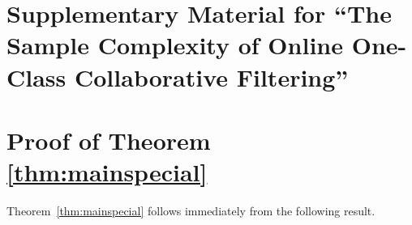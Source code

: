 \documentclass{article}
\begin{document}













\onecolumn

\newpage 



\section*{Supplementary Material for
``The Sample Complexity of Online One-Class Collaborative Filtering''}



\section{\label{sec:proof}Proof of Theorem \ref{thm:mainspecial}}

Theorem~\ref{thm:mainspecial} follows immediately from the following result. 
\end{document}
